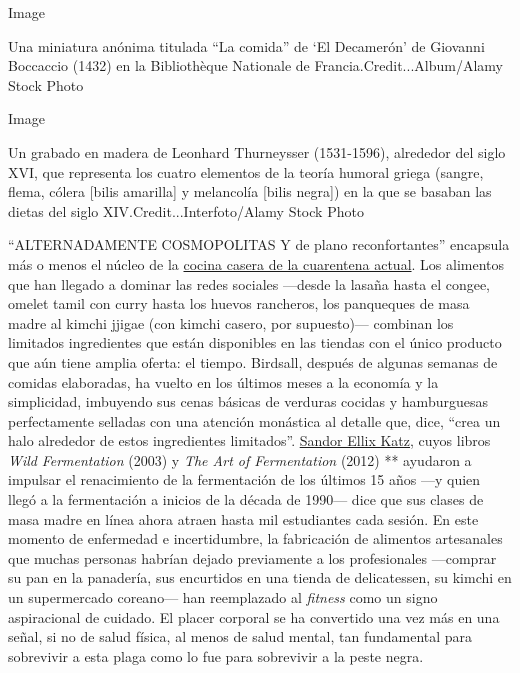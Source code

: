 Image

Una miniatura anónima titulada ``La comida'' de `El Decamerón' de
Giovanni Boccaccio (1432) en la Bibliothèque Nationale de
Francia.Credit...Album/Alamy Stock Photo

Image

Un grabado en madera de Leonhard Thurneysser (1531-1596), alrededor del
siglo XVI, que representa los cuatro elementos de la teoría humoral
griega (sangre, flema, cólera {[}bilis amarilla{]} y melancolía {[}bilis
negra{]}) en la que se basaban las dietas del siglo
XIV.Credit...Interfoto/Alamy Stock Photo

``ALTERNADAMENTE COSMOPOLITAS Y de plano reconfortantes'' encapsula más
o menos el núcleo de la
\href{https://www.nytimes3xbfgragh.onion/article/recipes-cooking-tips-coronavirus.html}{cocina
casera de la cuarentena actual}. Los alimentos que han llegado a dominar
las redes sociales ---desde la lasaña hasta el congee, omelet tamil con
curry hasta los huevos rancheros, los panqueques de masa madre al kimchi
jjigae (con kimchi casero, por supuesto)--- combinan los limitados
ingredientes que están disponibles en las tiendas con el único producto
que aún tiene amplia oferta: el tiempo. Birdsall, después de algunas
semanas de comidas elaboradas, ha vuelto en los últimos meses a la
economía y la simplicidad, imbuyendo sus cenas básicas de verduras
cocidas y hamburguesas perfectamente selladas con una atención monástica
al detalle que, dice, ``crea un halo alrededor de estos ingredientes
limitados''.
\href{https://www.wildfermentation.com/who-is-sandorkraut/}{Sandor Ellix
Katz}, cuyos libros \emph{Wild} \emph{Fermentation} (2003) y \emph{The
Art of Fermentation} (2012) ** ayudaron a impulsar el renacimiento de la
fermentación de los últimos 15 años ---y quien llegó a la fermentación a
inicios de la década de 1990--- dice que sus clases de masa madre en
línea ahora atraen hasta mil estudiantes cada sesión. En este momento de
enfermedad e incertidumbre, la fabricación de alimentos artesanales que
muchas personas habrían dejado previamente a los profesionales
---comprar su pan en la panadería, sus encurtidos en una tienda de
delicatessen, su kimchi en un supermercado coreano--- han reemplazado al
\emph{fitness} como un signo aspiracional de cuidado. El placer corporal
se ha convertido una vez más en una señal, si no de salud física, al
menos de salud mental, tan fundamental para sobrevivir a esta plaga como
lo fue para sobrevivir a la peste negra.

